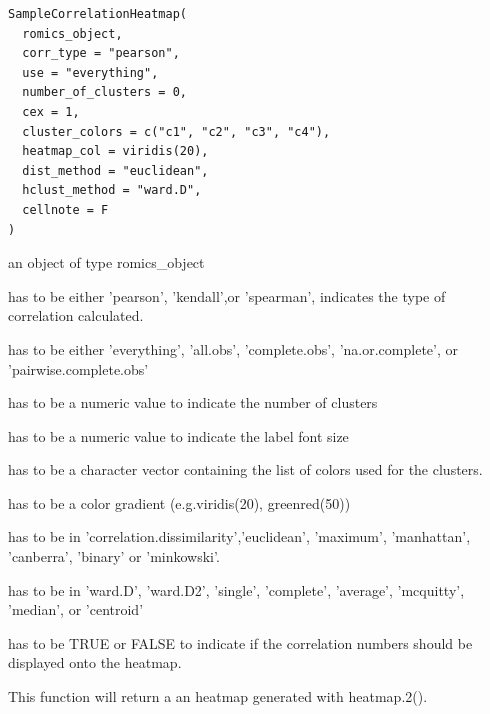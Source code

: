 \documentclass[a4paper]{book}
\begin{document}
%
\begin{Usage}
\begin{verbatim}
SampleCorrelationHeatmap(
  romics_object,
  corr_type = "pearson",
  use = "everything",
  number_of_clusters = 0,
  cex = 1,
  cluster_colors = c("c1", "c2", "c3", "c4"),
  heatmap_col = viridis(20),
  dist_method = "euclidean",
  hclust_method = "ward.D",
  cellnote = F
)
\end{verbatim}
\end{Usage}
%
\begin{Arguments}
\begin{ldescription}
\item[\code{romics\_object}] an object of type romics\_object

\item[\code{corr\_type}] has to be either 'pearson', 'kendall',or 'spearman', indicates the type of correlation calculated.

\item[\code{use}] has to be either 'everything', 'all.obs', 'complete.obs', 'na.or.complete', or 'pairwise.complete.obs'

\item[\code{number\_of\_clusters}] has to be a numeric value to indicate the number of clusters

\item[\code{cex}] has to be a numeric value to indicate the label font size

\item[\code{cluster\_colors}] has to be a character vector containing the list of colors used for the clusters.

\item[\code{heatmap\_col}] has to be a color gradient (e.g.viridis(20), greenred(50))

\item[\code{dist\_method}] has to be in 'correlation.dissimilarity','euclidean', 'maximum', 'manhattan', 'canberra', 'binary' or 'minkowski'.

\item[\code{hclust\_method}] has to be in 'ward.D', 'ward.D2', 'single', 'complete', 'average', 'mcquitty', 'median', or 'centroid'

\item[\code{cellnote}] has to be TRUE or FALSE to indicate if the correlation numbers should be displayed onto the heatmap.
\end{ldescription}
\end{Arguments}
%
\begin{Value}
This function will return a an heatmap generated with heatmap.2().
\end{Value}
\end{document}
